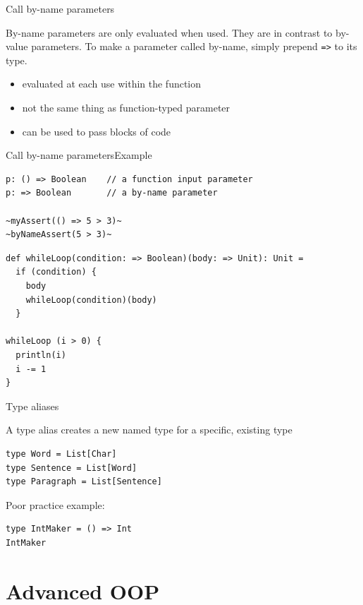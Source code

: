 \documentclass[aspectratio=169]{beamer}
\begin{document}
\begin{frame}{Call by-name parameters}
\begin{block}{}
By-name parameters are only evaluated when used. They are in contrast to by-value parameters. To
make a parameter called by-name, simply prepend \texttt{=>} to its type.
\end{block}
\begin{itemize}
  \item evaluated at \alert{each} use within the function
  \item not the same thing as function-typed parameter
  \item can be used to pass blocks of code
\end{itemize}
\end{frame}

\begin{frame}[fragile]{Call by-name parameters}{Example}
\begin{lstlisting}[style=scala]
p: () => Boolean    // a function input parameter
p: => Boolean       // a by-name parameter

~myAssert(() => 5 > 3)~
~byNameAssert(5 > 3)~
\end{lstlisting}
\pause
\begin{lstlisting}[style=scala]
def whileLoop(condition: => Boolean)(body: => Unit): Unit =
  if (condition) {
    body
    whileLoop(condition)(body)
  }

whileLoop (i > 0) {
  println(i)
  i -= 1
}
\end{lstlisting}
\end{frame}

\begin{frame}[fragile]{Type aliases}
\begin{block}{}
  A type alias creates a new named type for a specific, existing type
\end{block}
\vspace{1em}
\begin{lstlisting}[style=scala]
type Word = List[Char]
type Sentence = List[Word]
type Paragraph = List[Sentence]
\end{lstlisting}
\pause
Poor practice example:
\begin{lstlisting}[style=scala]
type IntMaker = () => Int
IntMaker
\end{lstlisting}
\end{frame}

\section{Advanced OOP}
\end{document}
